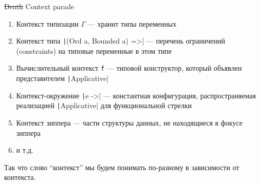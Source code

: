     \begin{frame}{\st{Death} Context parade \popslide}
        \begin{enumerate}
            \item Контекст типизации $\Gamma$ --- хранит типы переменных
            \item Контекст типа \texttt|(Ord a, Bounded a) =>| --- перечень ограничений (constraints) на типовые переменные в этом типе
            \item Вычислительный контекст \texttt{f} --- типовой конструктор, который объявлен представителем \texttt|Applicative|
            \item Контекст-окружение \texttt|e ->| --- константная конфигурация, распространяемая реализацией \texttt|Applicative| для функциональной стрелки
            \item Контекст зиппера --- части структуры данных, не находящиеся в фокусе зиппера
            \item и т.д.
        \end{enumerate}
        \vspace{0.5em}
        Так что слово ``контекст'' мы будем понимать по-разному в зависимости от контекста.
    \end{frame}
    

